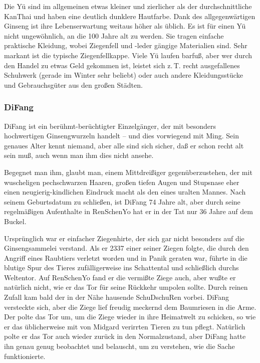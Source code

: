 \documentclass[
a4paper,
twoside,
DIV=calc,
BCOR=4mm,
fontsize=9pt,
twocolumn=on,
titlepage=on,
parskip=half
]{scrartcl}
\begin{document}
Die Yü sind im allgemeinen etwas kleiner und zierlicher als der
durchschnittliche KanThai und haben eine deutlich dunklere
Hautfarbe. Dank des allgegenwärtigen Ginseng ist ihre Lebenserwartung
weitaus höher als üblich. Es ist für einen Yü nicht ungewöhnlich, an die
100 Jahre alt zu werden. Sie tragen einfache praktische Kleidung,
wobei Ziegenfell und -leder gängige Materialien sind. Sehr markant ist
die typische Ziegenfellkappe. Viele Yü laufen barfuß, aber wer durch
den Handel zu etwas Geld gekommen ist, leistet sich z.\,T. recht
ausgefallenes Schuhwerk (gerade im Winter sehr beliebt) oder auch
andere Kleidungsstücke und Gebrauchsgüter aus den großen Städten.

\subsubsection{DiFang}

DiFang ist ein berühmt-berüchtigter Einzelgänger, der mit besonders
hochwertigen Ginsengwurzeln handelt -- und dies vorwiegend mit
Ming. Sein genaues Alter kennt niemand, aber alle sind sich sicher,
daß er schon recht alt sein muß, auch wenn man ihm dies nicht ansehe.

Begegnet man ihm, glaubt man, einem Mittdreißiger gegenüberzustehen,
der mit wuscheligen pechschwarzen Haaren, großen tiefen Augen und
Stupsnase eher einen neugierig-kindlichen Eindruck macht als den eines
uralten Mannes. Nach seinem Geburtsdatum zu schließen, ist DiFang 74
Jahre alt, aber durch seine regelmäßigen Aufenthalte in RenSchenYo hat
er in der Tat nur 36 Jahre auf dem Buckel.

Ursprünglich war er einfacher Ziegenhirte, der sich gar nicht
besonders auf die Ginsengsammelei verstand. Als er 2337 einer seiner
Ziegen folgte, die durch den Angriff eines Raubtiers verletzt worden
und in Panik geraten war, führte in die blutige Spur des Tieres
zufälligerweise ins Schattental und schließlich durchs Weltentor. Auf
RenSchenYo fand er die vermißte Ziege auch, aber wußte er natürlich
nicht, wie er das Tor für seine Rückkehr umpolen sollte. Durch reinen
Zufall kam bald der in der Nähe hausende SchuDschuRen vorbei. DiFang
versteckte sich, aber die Ziege lief freudig meckernd dem Baumriesen
in die Arme. Der polte das Tor um, um die Ziege wieder in ihre
Heimatwelt zu schicken, so wie er das üblicherweise mit von Midgard
verirrten Tieren zu tun pflegt. Natürlich polte er das Tor auch wieder
zurück in den Normalzustand, aber DiFang hatte ihn genau genug
beobachtet und belauscht, um zu verstehen, wie die Sache
funktionierte.
\end{document}
